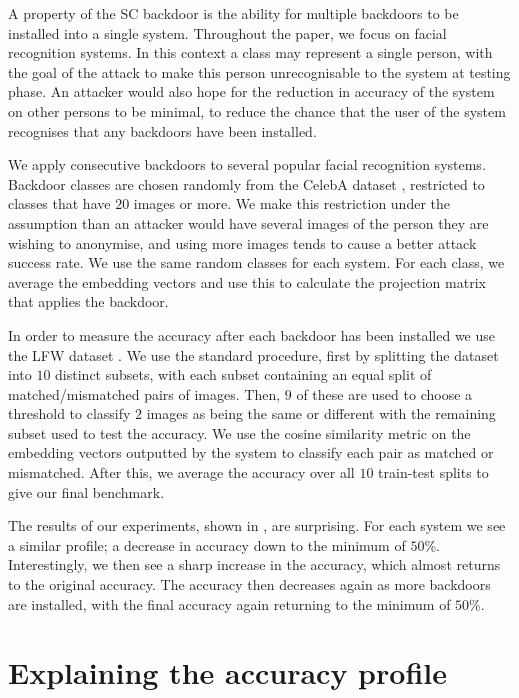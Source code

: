 \documentclass{article}
\theoremstyle{plain}
\theoremstyle{definition}
\theoremstyle{remark}
\begin{document}
A property of the SC backdoor is the ability for multiple backdoors to be installed into a single system. Throughout the paper, we focus on facial recognition systems. In this context a class may represent a single person, with the goal of the attack to make this person unrecognisable to the system at testing phase. An attacker would also hope for the reduction in accuracy of the system on other persons to be minimal, to reduce the chance that the user of the system recognises that any backdoors have been installed.

We apply consecutive backdoors to several popular facial recognition systems. Backdoor classes are chosen randomly from the CelebA dataset , restricted to classes that have \( 20 \) images or more. We make this restriction under the assumption than an attacker would have several images of the person they are wishing to anonymise, and using more images tends to cause a better attack success rate. We use the same random classes for each system. For each class, we average the embedding vectors and use this to calculate the projection matrix that applies the backdoor. 

In order to measure the accuracy after each backdoor has been installed we use the LFW dataset . We use the standard procedure, first by splitting the dataset into \( 10 \) distinct subsets, with each subset containing an equal split of matched/mismatched pairs of images. Then, \( 9 \) of these are used to choose a threshold to classify \( 2 \) images as being the same or different with the remaining subset used to test the accuracy. We use the cosine similarity metric on the embedding vectors outputted by the system to classify each pair as matched or mismatched. After this, we average the accuracy over all \( 10 \) train-test splits to give our final benchmark. 


The results of our experiments, shown in , are surprising. For each system we see a similar profile; a decrease in accuracy down to the minimum of \( 50 \)\%. Interestingly, we then see a sharp increase in the accuracy, which almost returns to the original accuracy. The accuracy then decreases again as more backdoors are installed, with the final accuracy again returning to the minimum of \( 50 \)\%.

\section{Explaining the accuracy profile}
\end{document}
